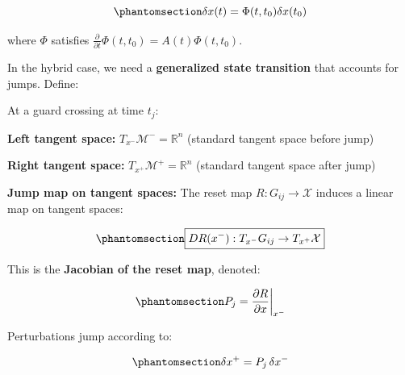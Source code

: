 \documentclass[
  letterpaper,
  DIV=11,
  numbers=noendperiod]{scrartcl}
\begin{document}
\begin{equation}\phantomsection\label{eq-smooth-transition}{
\delta x(t) = \Phi(t, t_0) \delta x(t_0)
}\end{equation}

where \(\Phi\) satisfies
\(\frac{\partial}{\partial t}\Phi(t, t_0) = A(t)\Phi(t, t_0)\).

In the hybrid case, we need a \textbf{generalized state transition} that
accounts for jumps. Define:

\begin{tcolorbox}[enhanced jigsaw, coltitle=black, titlerule=0mm, toprule=.15mm, opacitybacktitle=0.6, left=2mm, opacityback=0, rightrule=.15mm, leftrule=.75mm, breakable, colframe=quarto-callout-tip-color-frame, bottomtitle=1mm, toptitle=1mm, arc=.35mm, title=\textcolor{quarto-callout-tip-color}{\faLightbulb}\hspace{0.5em}{Definition: Left and Right Tangent Spaces at a Jump}, bottomrule=.15mm, colback=white, colbacktitle=quarto-callout-tip-color!10!white]

At a guard crossing at time \(t_j\):

\textbf{Left tangent space:} \(T_{x^-}\mathcal{M}^- = \mathbb{R}^n\)
(standard tangent space before jump)

\textbf{Right tangent space:} \(T_{x^+}\mathcal{M}^+ = \mathbb{R}^n\)
(standard tangent space after jump)

\textbf{Jump map on tangent spaces:} The reset map
\(R: G_{ij} \to \mathcal{X}\) induces a linear map on tangent spaces:

\begin{equation}\phantomsection\label{eq-reset-derivative}{
\boxed{D R(x^-): T_{x^-}G_{ij} \to T_{x^+}\mathcal{X}}
}\end{equation}

This is the \textbf{Jacobian of the reset map}, denoted:

\begin{equation}\phantomsection\label{eq-reset-jacobian}{
P_j = \frac{\partial R}{\partial x}\bigg|_{x^-}
}\end{equation}

Perturbations jump according to:

\begin{equation}\phantomsection\label{eq-perturbation-jump}{
\delta x^+ = P_j \, \delta x^-
}\end{equation}

\end{tcolorbox}
\end{document}
